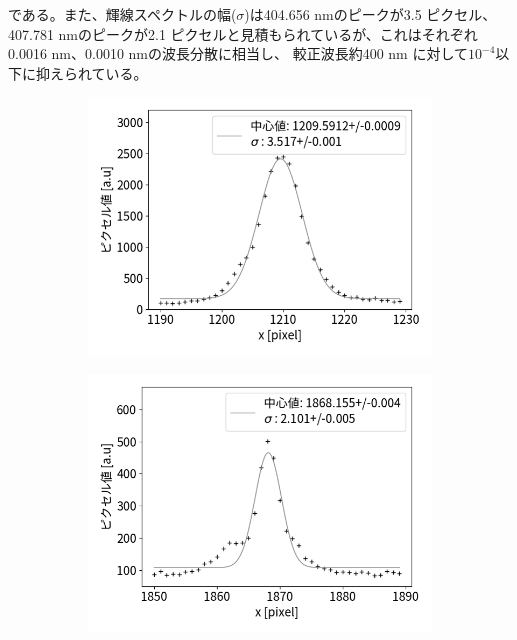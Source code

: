 \documentclass[a4paper,11pt,uplatex]{jsbook}
\begin{document}
である。また、輝線スペクトルの幅($\sigma$)は404.656 nmのピークが3.5 ピクセル、407.781 nmのピークが2.1 ピクセルと見積もられているが、これはそれぞれ0.0016 nm、0.0010 nmの波長分散に相当し、
較正波長約400 nm に対して$10^{-4}$以下に抑えられている。
\begin{figure}[H]
  \centering
  \begin{subfigure}[h]{0.45\linewidth}
    \centering
    \includegraphics[width=\linewidth]{image/4-fpeak.png}
  \end{subfigure}
  \hfill
  \begin{subfigure}[h]{0.45\linewidth}
    \centering
    \includegraphics[width=\linewidth]{image/4-speak.png}

\end{subfigure}
\end{figure}
\end{document}
